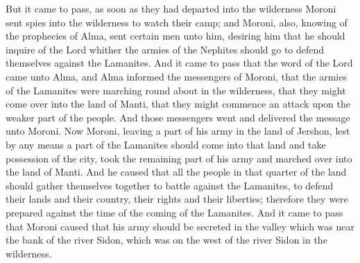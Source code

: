 But it came to pass, as soon as they had departed into the wilderness Moroni sent spies into the wilderness to watch their camp; and Moroni, also, knowing of the prophecies of Alma, sent certain men unto him, desiring him that he should inquire of the Lord whither the armies of the Nephites should go to defend themselves against the Lamanites.
\bverse \iffalse And it came to pass that the word of the Lord came unto Alma, and Alma informed the messengers of Moroni, that the armies of the Lamanites were marching round about in the wilderness, that they might come over into the land of Manti, that they might commence an attack upon the weaker part of the people. And those messengers went and delivered the message unto Moroni. \fi
And it came to pass that the word of the Lord came unto Alma, and Alma informed the messengers of Moroni, that the armies of the Lamanites were marching round about in the wilderness, that they might come over into the land of Manti, that they might commence an attack upon the weaker part of the people. And those messengers went and delivered the message unto Moroni.
\bverse \iffalse Now Moroni, leaving a part of his army in the land of Jershon, lest by any means a part of the Lamanites should come into that land and take possession of the city, took the remaining part of his army and marched over into the land of Manti. \fi
Now Moroni, leaving a part of his army in the land of Jershon, lest by any means a part of the Lamanites should come into that land and take possession of the city, took the remaining part of his army and marched over into the land of Manti.
\bverse \iffalse And he caused that all the people in that quarter of the land should gather themselves together to battle against the Lamanites, to defend their lands and their country, their rights and their liberties; therefore they were prepared against the time of the coming of the Lamanites. \fi
And he caused that all the people in that quarter of the land should gather themselves together to battle against the Lamanites, to defend their lands and their country, their rights and their liberties; therefore they were prepared against the time of the coming of the Lamanites.
\bverse \iffalse And it came to pass that Moroni caused that his army should be secreted in the valley which was near the bank of the river Sidon, which was on the west of the river Sidon in the wilderness. \fi
And it came to pass that Moroni caused that his army should be secreted in the valley which was near the bank of the river Sidon, which was on the west of the river Sidon in the wilderness.
